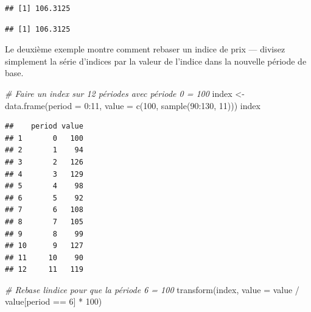 \documentclass[
]{article}
\newenvironment{Shaded}{\begin{snugshade}}{\end{snugshade}}
\newcommand{\AttributeTok}[1]{\textcolor[rgb]{0.77,0.63,0.00}{#1}}
\newcommand{\CommentTok}[1]{\textcolor[rgb]{0.56,0.35,0.01}{\textit{#1}}}
\newcommand{\DecValTok}[1]{\textcolor[rgb]{0.00,0.00,0.81}{#1}}
\newcommand{\FunctionTok}[1]{\textcolor[rgb]{0.00,0.00,0.00}{#1}}
\newcommand{\NormalTok}[1]{#1}
\newcommand{\OtherTok}[1]{\textcolor[rgb]{0.56,0.35,0.01}{#1}}
\newcommand{\SpecialCharTok}[1]{\textcolor[rgb]{0.00,0.00,0.00}{#1}}
\begin{document}
\begin{verbatim}
## [1] 106.3125
\end{verbatim}

\begin{Shaded}
\end{Shaded}

\begin{verbatim}
## [1] 106.3125
\end{verbatim}

Le deuxième exemple montre comment rebaser un indice de prix --- divisez simplement la série d'indices par la valeur de l'indice dans la nouvelle période de base.

\begin{Shaded}
\begin{Highlighting}[]
\CommentTok{\# Faire un index sur 12 périodes avec période 0 = 100}
\NormalTok{index }\OtherTok{\textless{}{-}} \FunctionTok{data.frame}\NormalTok{(}\AttributeTok{period =} \DecValTok{0}\SpecialCharTok{:}\DecValTok{11}\NormalTok{, }\AttributeTok{value =} \FunctionTok{c}\NormalTok{(}\DecValTok{100}\NormalTok{, }\FunctionTok{sample}\NormalTok{(}\DecValTok{90}\SpecialCharTok{:}\DecValTok{130}\NormalTok{, }\DecValTok{11}\NormalTok{)))}
\NormalTok{index}
\end{Highlighting}
\end{Shaded}

\begin{verbatim}
##    period value
## 1       0   100
## 2       1    94
## 3       2   126
## 4       3   129
## 5       4    98
## 6       5    92
## 7       6   108
## 8       7   105
## 9       8    99
## 10      9   127
## 11     10    90
## 12     11   119
\end{verbatim}

\begin{Shaded}
\begin{Highlighting}[]
\CommentTok{\# Rebase l\textquotesingle{}indice pour que la période 6 = 100}
\FunctionTok{transform}\NormalTok{(index, }\AttributeTok{value =}\NormalTok{ value }\SpecialCharTok{/}\NormalTok{ value[period }\SpecialCharTok{==} \DecValTok{6}\NormalTok{] }\SpecialCharTok{*} \DecValTok{100}\NormalTok{)}
\end{Highlighting}
\end{Shaded}
\end{document}
